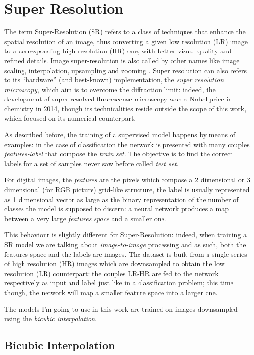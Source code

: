 \documentclass[12pt,a4paper]{report}
\begin{document}
\section{Super Resolution}

The term Super-Resolution (SR) refers to a class of techniques that enhance the spatial resolution of an image, thus converting a given low resolution (LR) image to a corresponding high resolution (HR) one, with better visual quality and refined details.
Image super-resolution is also called by other names like image scaling, interpolation, upsampling and zooming \cite{survey-sr}.
Super resolution can also refers to its ``hardware'' (and best-known) implementation, the {\it super resolution microscopy}, which aim is to overcome the diffraction limit: indeed, the development of super-resolved fluorescense microscopy won a Nobel price in chemistry in 2014, though its technicalities reside outside the scope of this work, which focused on its numerical counterpart.

As described before, the training of a supervised model happens by means of examples: in the case of classification the network is presented with many couples {\it features-label} that compose the {\it train set}. The objective is to find the correct labels for a set of samples never saw before called {\it test set}.

For digital images, the {\it features} are the pixels which compose a 2 dimensional or 3 dimensional (for RGB picture) grid-like structure, the label is usually represented as 1 dimensional vector as large as the binary representation of the number of classes the model is supposed to  discern: a neural network produces a map between a very large {\it features space} and a smaller one.

This behaviour is slightly different for Super-Resolution: indeed, when training a SR model we are talking about {\it image-to-image} processing and as such, both the features space and the labels are images.  
The dataset is built from a single series of high resolution (HR) images which are downsampled to obtain the low resolution (LR) counterpart: the couples LR-HR are fed to the network respectively as input and label just like in a classification problem; this time though, the network will map a smaller feature space into a larger one. 

The models I'm going to use in this work are trained on images downsampled using the {\it bicubic interpolation}.


\subsection{Bicubic Interpolation}
\end{document}
